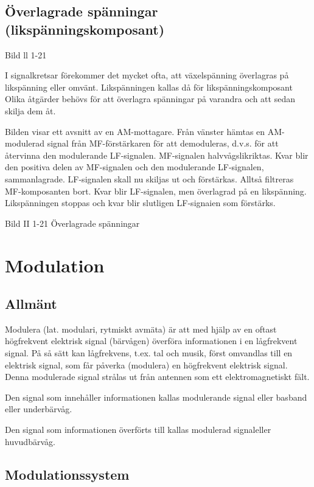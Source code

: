 \documentclass[a4paper,twoside,twocolumn,openright]{book}
\begin{document}
\subsection{Överlagrade spänningar
(likspänningskomposant)}

Bild ll 1-21

I signalkretsar förekommer det mycket ofta, att växelspänning överlagras på likspänning
eller omvänt. Likspänningen kallas då för likspänningskomposant Olika åtgärder behövs för
att överlagra spänningar på varandra och att sedan skilja dem åt.

Bilden visar ett avsnitt av en AM-mottagare. Från vänster hämtas en AM-modulerad signal
från MF-förstärkaren för att demoduleras, d.v.s. för att återvinna den modulerande
LF-signalen. MF-signalen halvvågslikriktas. Kvar blir den positiva delen av MF-signalen
och den modulerande LF-signalen, sammanlagrade. LF-signalen skall nu skiljas ut och
förstärkas. Alltså filtreras MF-komposanten bort. Kvar blir LF-signalen, men överlagrad på
en likspänning. Likspänningen stoppas och kvar blir slutligen LF-signaien som förstärks.

Bild II 1-21 Överlagrade spänningar

\cleardoublepage

\section{Modulation}

\subsection{Allmänt}

Modulera (lat. modulari, rytmiskt avmäta) är att med hjälp av en oftast högfrekvent
elektrisk signal (bärvågen) överföra informationen i en lågfrekvent signal. På så sätt kan
lågfrekvens, t.ex. tal och musik, först omvandlas till en elektrisk signal, som får 
påverka (modulera) en högfrekvent elektrisk signal. Denna modulerade signal strålas ut från
antennen som ett elektromagnetiskt fält.

Den signal som innehåller informationen kallas modulerande signal eller basband eller
underbärvåg.

Den signal som informationen överförts till kallas modulerad signaleller huvudbärvåg.

\subsection{Modulationssystem}
\end{document}
